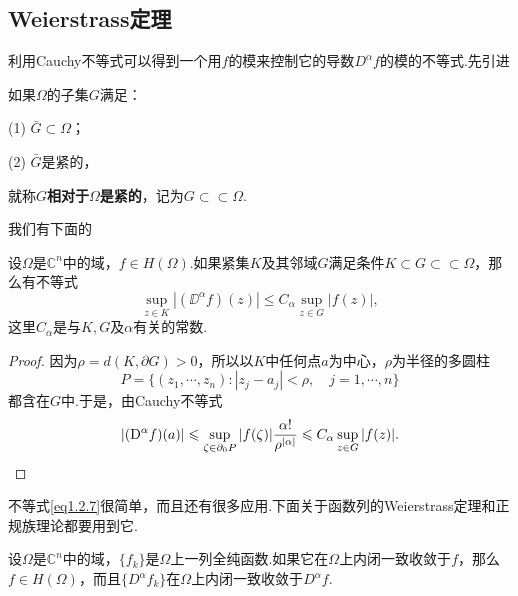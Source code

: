 \subsection{Weierstrass定理}
利用Cauchy不等式可以得到一个用$f$的模来控制它的导数$D^\alpha f$的模的不等式.先引进
\begin{definition}\label{def1.2.4}
	如果$\Omega$的子集$G$满足：
	
	(1)\hypertarget{1.2.4}{}
	$\bar{G}\subset\Omega$；
	
	(2)\hypertarget{1.2.4}{}
	$\bar{G}$是紧的，

就称\textbf{$G$相对于$\Omega$是紧的}，记为$G\subset\subset\Omega$.
\end{definition}
我们有下面的
\begin{theorem}\label{thm1.2.5}
	设$\Omega$是$\mathbb{C}^n$中的域，$f\in H(\Omega)$.如果紧集$K$及其邻域$G$满足条件$K\subset G\subset\subset\Omega$，那么有不等式
	\begin{equation}\label{eq1.2.7}
		\sup_{z\in K}|(\DD^\alpha f)(z)|\le C_\alpha \sup_{z\in G}|f(z)|,
	\end{equation}
	这里$C_\alpha$是与$K,G$及$\alpha$有关的常数.
\end{theorem}
\begin{proof}
	因为$\rho=d(K,\partial G)>0$，所以以$K$中任何点$a$为中心，$\rho$为半径的多圆柱
	\[P=\{(z_1,\cdots,z_n)\colon|z_j-a_j|<\rho,\quad j=1,\cdots,n\}\]
	都含在$G$中.于是，由Cauchy不等式
	\[|(\mathrm D^\alpha f)(a)|\leqslant \sup_{\zeta\in\partial_0 P}|f(\zeta)|\frac{\alpha!}{\rho^{|\alpha|}}\leqslant C_\alpha \sup_{z\in G}|f(z)|.\qedhere\]
\end{proof}
不等式\eqref{eq1.2.7}很简单，而且还有很多应用.下面关于函数列的Weierstrass定理和正规族理论都要用到它.
\begin{theorem}\label{thm1.2.6}
	设$\Omega$是$\mathbb{C}^n$中的域，$\{f_k\}$是$\Omega$上一列全纯函数.如果它在$\Omega$上内闭一致收敛于$f$，那么$f\in H(\Omega)$，而且$\{D^\alpha f_k\}$在$\Omega$上内闭一致收敛于$D^\alpha f$.
\end{theorem}

